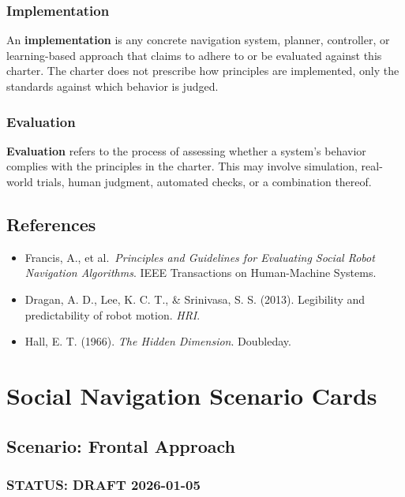 \documentclass[utf8]{frontiers_suppmat} %
\providecommand{\tightlist}{%
  \setlength{\itemsep}{0pt}\setlength{\parskip}{0pt}}
\begin{document}
\subsubsection{Implementation}\label{implementation}

An \textbf{implementation} is any concrete navigation system, planner,
controller, or learning-based approach that claims to adhere to or be
evaluated against this charter. The charter does not prescribe how
principles are implemented, only the standards against which behavior is
judged.

\subsubsection{Evaluation}\label{evaluation}

\textbf{Evaluation} refers to the process of assessing whether a
system's behavior complies with the principles in the charter. This may
involve simulation, real-world trials, human judgment, automated checks,
or a combination thereof.

\subsection{References}\label{references}

\begin{itemize}
\tightlist
\item
  Francis, A., et al.~\emph{Principles and Guidelines for Evaluating
  Social Robot Navigation Algorithms}. IEEE Transactions on
  Human-Machine Systems.
\item
  Dragan, A. D., Lee, K. C. T., \& Srinivasa, S. S. (2013). Legibility
  and predictability of robot motion. \emph{HRI}.
\item
  Hall, E. T. (1966). \emph{The Hidden Dimension}. Doubleday.
\end{itemize}


\section{Social Navigation Scenario Cards}
\subsection{Scenario: Frontal Approach}\label{scenario-frontal-approach}

\subsubsection{STATUS: DRAFT 2026-01-05}\label{status-draft-2026-01-05}
\end{document}

